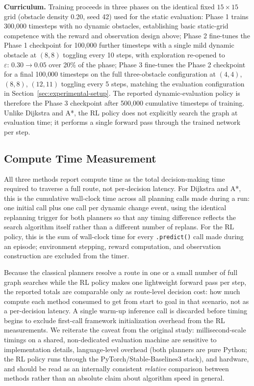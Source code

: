 \textbf{Curriculum.} Training proceeds in three phases on the identical fixed $15\times15$ grid (obstacle density 0.20, seed 42) used for the static evaluation: Phase 1 trains 300{,}000 timesteps with no dynamic obstacles, establishing basic static-grid competence with the reward and observation design above; Phase 2 fine-tunes the Phase 1 checkpoint for 100{,}000 further timesteps with a single mild dynamic obstacle at $(8,8)$ toggling every 10 steps, with exploration re-opened to $\varepsilon{:}\,0.30\to0.05$ over 20\% of the phase; Phase 3 fine-tunes the Phase 2 checkpoint for a final 100{,}000 timesteps on the full three-obstacle configuration at $(4,4)$, $(8,8)$, $(12,11)$ toggling every 5 steps, matching the evaluation configuration in Section~\ref{sec:experimental-setup}. The reported dynamic-evaluation policy is therefore the Phase 3 checkpoint after 500{,}000 cumulative timesteps of training. Unlike Dijkstra and A*, the RL policy does not explicitly search the graph at evaluation time; it performs a single forward pass through the trained network per step.

\subsection{Compute Time Measurement}
\label{sec:compute-time-measurement}

All three methods report compute time as the total decision-making time required to traverse a full route, not per-decision latency. For Dijkstra and A*, this is the cumulative wall-clock time across all planning calls made during a run: one initial call plus one call per dynamic change event, using the identical replanning trigger for both planners so that any timing difference reflects the search algorithm itself rather than a different number of replans. For the RL policy, this is the sum of wall-clock time for every \texttt{.predict()} call made during an episode; environment stepping, reward computation, and observation construction are excluded from the timer.

Because the classical planners resolve a route in one or a small number of full graph searches while the RL policy makes one lightweight forward pass per step, the reported totals are comparable only as route-level decision cost: how much compute each method consumed to get from start to goal in that scenario, not as a per-decision latency. A single warm-up inference call is discarded before timing begins to exclude first-call framework initialization overhead from the RL measurements. We reiterate the caveat from the original study: millisecond-scale timings on a shared, non-dedicated evaluation machine are sensitive to implementation details, language-level overhead (both planners are pure Python; the RL policy runs through the PyTorch/Stable-Baselines3 stack), and hardware, and should be read as an internally consistent \emph{relative} comparison between methods rather than an absolute claim about algorithm speed in general.
